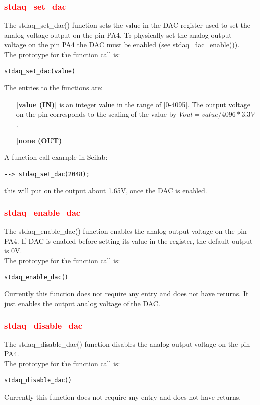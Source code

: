\documentclass[letterpaper,10pt,english]{hitec}
\begin{document}
\subsubsection{\textcolor{red}{stdaq\_set\_dac}}

The stdaq\_set\_dac() function sets the value in the DAC register used to set the analog voltage output on the pin PA4. To physically set the analog output voltage on the pin PA4 the DAC must be enabled (see stdaq\_dac\_enable()). \\
The prototype for the function call is:
\begin{verbatim}
stdaq_set_dac(value)
\end{verbatim}
The entries to the functions are:
\begin{itemize}
\item [\textbf{[value (IN)]}] is an integer value in the range of [0-4095]. The output voltage on the pin corresponds to the scaling of the value by $Vout = value/4096*3.3V$.
\item [\textbf{[none (OUT)]}] 
\end{itemize}
A function call example in Scilab:
\begin{verbatim}
--> stdaq_set_dac(2048);
\end{verbatim}
this will put on the output about 1.65V, once the DAC is enabled.

\subsubsection{\textcolor{red}{stdaq\_enable\_dac}}

The stdaq\_enable\_dac() function enables the analog output voltage on the pin PA4. If DAC is enabled before setting its value in the register, the default output is 0V. \\
The prototype for the function call is:
\begin{verbatim}
stdaq_enable_dac()
\end{verbatim}
Currently this function does not require any entry and does not have returns. It just enables the output analog voltage of the DAC.

\subsubsection{\textcolor{red}{stdaq\_disable\_dac}}

The stdaq\_disable\_dac() function disables the analog output voltage on the pin PA4. \\
The prototype for the function call is:
\begin{verbatim}
stdaq_disable_dac()
\end{verbatim}
Currently this function does not require any entry and does not have returns.
\end{document}
